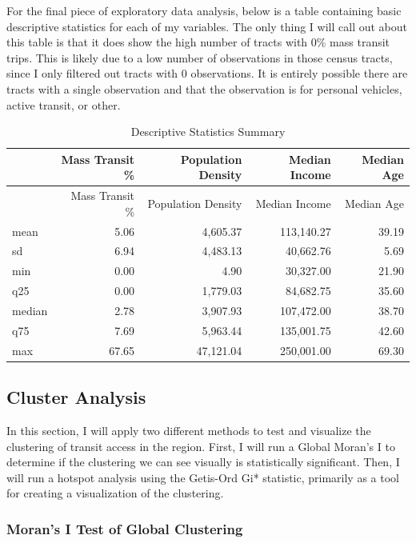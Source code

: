 \documentclass[
]{article}
\begin{document}
For the final piece of exploratory data analysis, below is a table
containing basic descriptive statistics for each of my variables. The
only thing I will call out about this table is that it does show the
high number of tracts with 0\% mass transit trips. This is likely due to
a low number of observations in those census tracts, since I only
filtered out tracts with 0 observations. It is entirely possible there
are tracts with a single observation and that the observation is for
personal vehicles, active transit, or other.

\begin{longtable}[]{@{}lrrrr@{}}
\caption{Descriptive Statistics Summary}\tabularnewline
\toprule\noalign{}
& Mass Transit \% & Population Density & Median Income & Median Age \\
\midrule\noalign{}
\endfirsthead
\toprule\noalign{}
& Mass Transit \% & Population Density & Median Income & Median Age \\
\midrule\noalign{}
\endhead
\bottomrule\noalign{}
\endlastfoot
mean & 5.06 & 4,605.37 & 113,140.27 & 39.19 \\
sd & 6.94 & 4,483.13 & 40,662.76 & 5.69 \\
min & 0.00 & 4.90 & 30,327.00 & 21.90 \\
q25 & 0.00 & 1,779.03 & 84,682.75 & 35.60 \\
median & 2.78 & 3,907.93 & 107,472.00 & 38.70 \\
q75 & 7.69 & 5,963.44 & 135,001.75 & 42.60 \\
max & 67.65 & 47,121.04 & 250,001.00 & 69.30 \\
\end{longtable}

\subsection{Cluster Analysis}\label{cluster-analysis}

In this section, I will apply two different methods to test and
visualize the clustering of transit access in the region. First, I will
run a Global Moran's I to determine if the clustering we can see
visually is statistically significant. Then, I will run a hotspot
analysis using the Getis-Ord Gi* statistic, primarily as a tool for
creating a visualization of the clustering.

\subsubsection{Moran's I Test of Global
Clustering}\label{morans-i-test-of-global-clustering}
\end{document}

